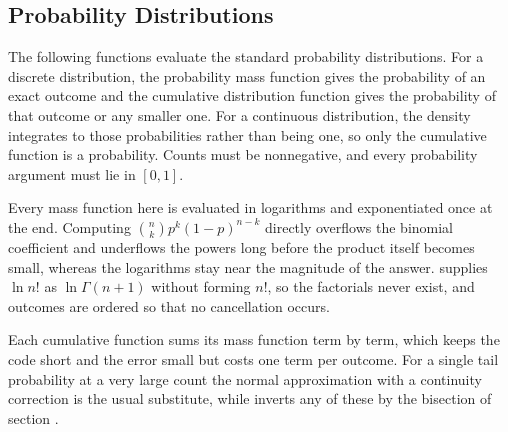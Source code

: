 \subsection{Probability Distributions}
\label{sec:6.7.1}
The following functions evaluate the standard probability distributions. For a discrete distribution, the probability mass function gives the probability of an exact outcome and the cumulative distribution function gives the probability of that outcome or any smaller one. For a continuous distribution, the density integrates to those probabilities rather than being one, so only the cumulative function is a probability. Counts must be nonnegative, and every probability argument must lie in $[0, 1]$.

Every mass function here is evaluated in logarithms and exponentiated once at the end. Computing $\binom{n}{k} p^k (1 - p)^{n-k}$ directly overflows the binomial coefficient and underflows the powers long before the product itself becomes small, whereas the logarithms stay near the magnitude of the answer.  supplies $\ln n!$ as $\ln \Gamma(n + 1)$ without forming $n!$, so the factorials never exist, and outcomes are ordered so that no cancellation occurs.

Each cumulative function sums its mass function term by term, which keeps the code short and the error small but costs one term per outcome. For a single tail probability at a very large count the normal approximation with a continuity correction is the usual substitute, while  inverts any of these by the bisection of section .

